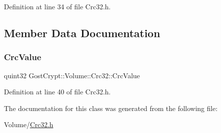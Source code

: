 Definition at line 34 of file Crc32.\+h.



\subsection{Member Data Documentation}
\mbox{\label{class_gost_crypt_1_1_volume_1_1_crc32_af33604ae677c98ac06ecb32f9a482305}} 
\subsubsection{\texorpdfstring{Crc\+Value}{CrcValue}}
{\footnotesize\ttfamily quint32 Gost\+Crypt\+::\+Volume\+::\+Crc32\+::\+Crc\+Value\hspace{0.3cm}{\ttfamily [protected]}}



Definition at line 40 of file Crc32.\+h.



The documentation for this class was generated from the following file\+:\begin{DoxyCompactItemize}
\item 
Volume/\hyperlink{_crc32_8h}{Crc32.\+h}\end{DoxyCompactItemize}
